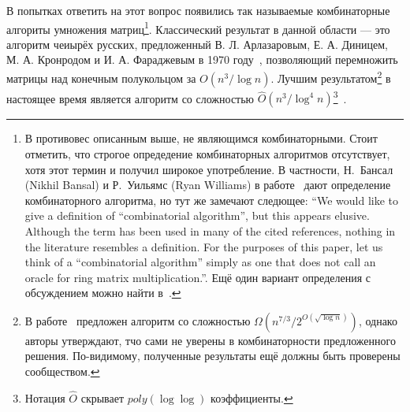 В попытках ответить на этот вопрос появились так называемые комбинаторные алгориты умножения матриц\footnote{В противовес описанным выше, не являющимся комбинаторными. Стоит отметить, что строгое опредедение комбинаторных алгоритмов отсутствует, хотя этот термин и получил широкое употребление. В частности, Н.~Бансал (Nikhil Bansal) и Р.~Уильямс (Ryan Williams) в работе~\cite{5438580} дают определение комбинаторного алгоритма, но тут же замечают следющее: ``We would like to give a definition of ``combinatorial algorithm'', but this appears elusive. Although the term has been used in many of the cited references, nothing in the literature resembles a definition. For the purposes of this paper, let us think of a ``combinatorial algorithm'' simply as one that does not call an oracle for ring matrix multiplication.''. Ещё один вариант определения с обсуждением можно найти в~\cite{das2018lower}.}. Классический результат в данной области --- это алгоритм чеиырёх русских, предложенный  В. Л. Арлазаровым, Е. А. Диницем, М. А. Кронродом и И. А. Фараджевым в 1970 году~\cite{ArlDinKro70}, позволяющий перемножить матрицы над конечным полукольцом за $O(n^3/\log n)$. Лучшим результатом\footnote{В работе~\cite{das2018lower} предложен алгоритм со сложностью $\Omega(n^{7/3}/2^{O(\sqrt{\log n})})$, однако авторы утверждают, тчо сами не уверены в комбинаторности предложенного решения. По-видимому, полученные результаты ещё должны быть проверены сообществом.} в настоящее время является алгоритм со сложностью $\hat{O}(n^3/\log^4 n)$\footnote{Нотация $\hat{O}$ скрывает $poly(\log\log)$ коэффициенты.}~\cite{10.1007/978-3-662-47672-7_89}.



